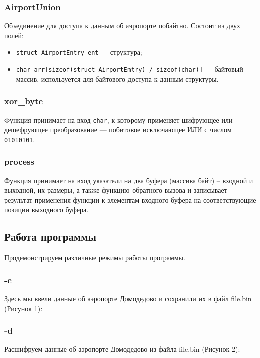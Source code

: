 \subsubsection{AirportUnion}
Объединение для доступа к данным об аэропорте побайтно. Состоит из двух полей:
\begin{itemize}
    \item \texttt{struct AirportEntry ent} — структура;
    \item \texttt{char arr[sizeof(struct AirportEntry) / sizeof(char)]} — байтовый массив, используется для байтового доступа к данным структуры.
\end{itemize}

\subsubsection{xor\_byte}
Функция принимает на вход \verb|char|, к которому применяет шифрующее или дешефрующее преобразование — побитовое исключающее ИЛИ с числом \verb|01010101|.

\subsubsection{process}
Функция принимает на вход указатели на два буфера (массива байт) – входной и выходной, их размеры, а также функцию обратного вызова и записывает результат применения функции к элементам входного буфера на соответствующие позиции выходного буфера.



\subsection{Работа программы}
Продемонстрируем различные режимы работы программы.

\subsubsection{-e}
Здесь мы ввели данные об аэропорте Домодедово и сохранили их в файл file.bin (Рисунок 1):

\FloatBarrier


\subsubsection{-d}
Расшифруем данные об аэропорте Домодедово из файла file.bin (Рисунок 2):

\FloatBarrier


